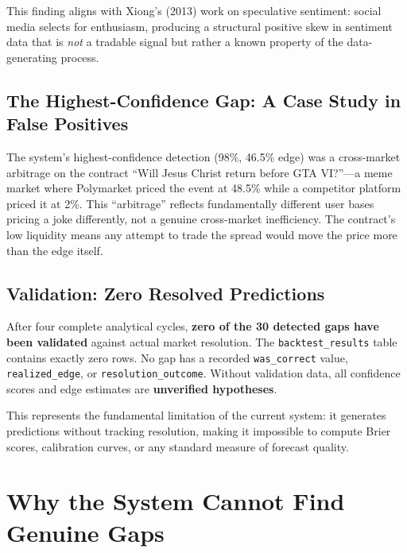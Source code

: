 \documentclass[12pt, letterpaper]{article}
\begin{document}
This finding aligns with Xiong's (2013) work on speculative sentiment: social media selects for enthusiasm, producing a structural positive skew in sentiment data that is \textit{not} a tradable signal but rather a known property of the data-generating process.

\subsection{The Highest-Confidence Gap: A Case Study in False Positives}

The system's highest-confidence detection (98\%, 46.5\% edge) was a cross-market arbitrage on the contract ``Will Jesus Christ return before GTA VI?''---a meme market where Polymarket priced the event at 48.5\% while a competitor platform priced it at 2\%. This ``arbitrage'' reflects fundamentally different user bases pricing a joke differently, not a genuine cross-market inefficiency. The contract's low liquidity means any attempt to trade the spread would move the price more than the edge itself.

\subsection{Validation: Zero Resolved Predictions}

\begin{tcolorbox}[colback=red!5, colframe=red!60, title=Critical Finding]
After four complete analytical cycles, \textbf{zero of the 30 detected gaps have been validated} against actual market resolution. The \texttt{backtest\_results} table contains exactly zero rows. No gap has a recorded \texttt{was\_correct} value, \texttt{realized\_edge}, or \texttt{resolution\_outcome}. Without validation data, all confidence scores and edge estimates are \textbf{unverified hypotheses}.
\end{tcolorbox}

This represents the fundamental limitation of the current system: it generates predictions without tracking resolution, making it impossible to compute Brier scores, calibration curves, or any standard measure of forecast quality.

\section{Why the System Cannot Find Genuine Gaps}
\label{sec:why}
\end{document}
